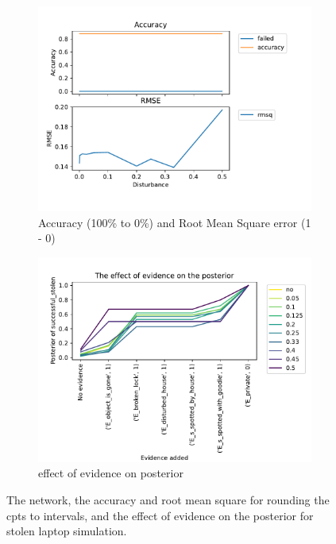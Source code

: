 \begin{figure}[h]
\begin{subfigure}{.5\textwidth}
\includegraphics[width=\linewidth]{../experiments/StolenLaptop/plots/performance_StolenLaptop.pdf}
\caption{Accuracy (100\% to 0\%) and Root Mean Square error (1 - 0) }
\label{laptopAcc}
\end{subfigure}
\begin{subfigure}{.5\textwidth}

\includegraphics[width=\linewidth]{../experiments/StolenLaptop/plots/posterior_StolenLaptop.pdf}
\caption{effect of evidence on posterior}
\label{laptopPosterior}

\end{subfigure}
\caption{The network, the accuracy and root mean square for rounding the cpts to intervals, and the effect of evidence on the posterior for stolen laptop simulation.}
\label{laptop}
\end{figure}



